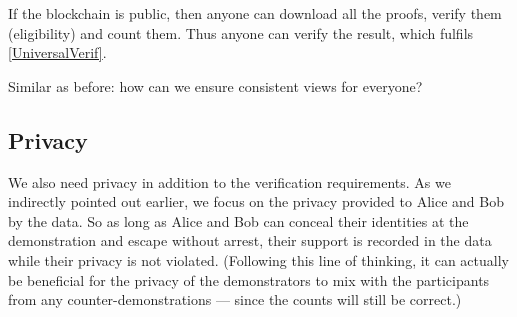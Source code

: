 If the blockchain is public, then anyone can download all the proofs, verify 
them (eligibility) and count them.
Thus anyone can verify the result, which fulfils \cref{UniversalVerif}.

\begin{frame}

  \pause

  \begin{question}
    Similar as before: how can we ensure consistent views for everyone?
  \end{question}
\end{frame}

\subsection{Privacy}
\label{Privacy}

We also need privacy in addition to the verification requirements.
As we indirectly pointed out earlier, we focus on the privacy provided to Alice 
and Bob by the data.
So as long as Alice and Bob can conceal their identities at the demonstration 
and escape without arrest, their support is recorded in the data while their 
privacy is not violated.
(Following this line of thinking, it can actually be beneficial for the privacy 
of the demonstrators to mix with the participants from any 
counter-demonstrations --- since the counts will still be correct.)

